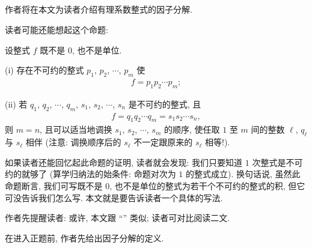 \subsection*{\FactorizationOfPolynomialsOverQ}
\markright{\FactorizationOfPolynomialsOverQ}

作者将在本文为读者介绍有理系数整式的因子分解.

读者可能还能想起这个命题:
\begin{proposition}
    设整式 $f$ 既不是 $0$, 也不是单位.

    (i) 存在不可约的整式 $p_1$, $p_2$, $\cdots$, $p_m$ 使
    \begin{align*}
        f = p_1 p_2 \cdots p_m;
    \end{align*}

    (ii) 若 $q_1$, $q_2$, $\cdots$, $q_m$, $s_1$, $s_2$, $\cdots$, $s_n$ 是不可约的整式, 且
    \begin{align*}
        f = q_1 q_2 \cdots q_m = s_1 s_2 \cdots s_n,
    \end{align*}
    则 $m = n$, 且可以适当地调换 $s_1$, $s_2$, $\cdots$, $s_m$ 的顺序, 使任取 $1$ 至 $m$ 间的整数 $\ell$, $q_\ell$ 与 $s_\ell$ 相伴 (注意: 调换顺序后的 $s_\ell$ 不一定跟原来的 $s_\ell$ 相等!).
\end{proposition}

如果读者还能回忆起此命题的证明, 读者就会发现: 我们只要知道 $1$ 次整式是不可约的就够了 (算学归纳法的始条件: 命题对次为 $1$ 的整式成立). 换句话说, 虽然此命题断言, 我们可写既不是 $0$, 也不是单位的整式为若干个不可约的整式的积, 但它可没告诉我们怎么写. 本文就是要告诉读者一个具体的写法.

作者先提醒读者: 或许, 本文跟 ``\FactorizationOfIntegers '' 类似; 读者可对比阅读二文.

在进入正题前, 作者先给出因子分解的定义.

